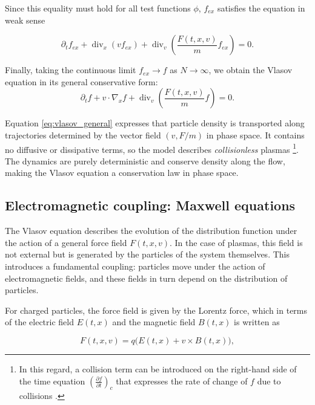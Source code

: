 \documentclass[11pt,a4paper,twoside,pdf]{article}
\numberwithin{equation}{section}
\begin{document}
Since this equality must hold for all test functions $\phi$, $f_{ex}$ satisfies the equation in weak sense


\[
\partial_t f_{ex}
+ \operatorname{div}_x(v f_{ex})
+ \operatorname{div}_v\!\left(\frac{F(t,x,v)}{m} f_{ex}\right)=0.
\]



Finally, taking the continuous limit $f_{ex}\to f$ as $N\to\infty$, we obtain the Vlasov equation in its general conservative form:
\begin{equation}
\partial_t f + v\cdot\nabla_x f
+ \operatorname{div}_v\!\left(\frac{F(t,x,v)}{m}f\right)=0.
\label{eq:vlasov_general}
\end{equation}

\medskip


Equation \eqref{eq:vlasov_general} expresses that particle density is transported along trajectories determined by the vector field $(v,F/m)$ in phase space. It contains no diffusive or dissipative terms, so the model describes \emph{collisionless} plasmas \footnote{In this regard, a collision term can be introduced on the right-hand side of the time equation $\left( \frac{\partial f}{\partial t} \right)_c$ that expresses the rate of change of $f$ due to collisions \cite{chen1984introduction}.}. The dynamics are purely deterministic and conserve density along the flow, making the Vlasov equation a conservation law in phase space.




\subsection{Electromagnetic coupling: Maxwell equations}

The Vlasov equation describes the evolution of the distribution function under the action of a general force field $F(t,x,v)$. In the case of plasmas, this field is not external but is generated by the particles of the system themselves. This introduces a fundamental coupling: particles move under the action of electromagnetic fields, and these fields in turn depend on the distribution of particles.

For charged particles, the force field is given by the Lorentz force, which in terms of the electric field $E(t,x)$ and the magnetic field $B(t,x)$ is written as \cite{martin2021campo}


\[
F(t,x,v) = q\big(E(t,x) + v \times B(t,x)\big),
\]
\end{document}
